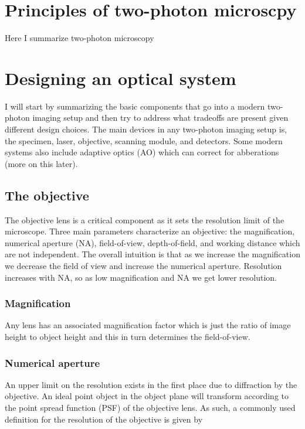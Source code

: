 

\section{Principles of two-photon microscpy}

Here I summarize two-photon microscopy

\section{Designing an optical system}

I will start by summarizing the basic components that go into a modern two-photon imaging setup and then try to 
address what tradeoffs are present given different design choices. The main devices in any two-photon imaging setup
is, the specimen, laser, objective, scanning module, and detectors. Some modern systems also include adaptive optics (AO) 
which can correct for abberations (more on this later).

\subsection{The objective}

The objective lens is a critical component as it sets the resolution limit of the microscope. Three main parameters
characterize an objective: the magnification, numerical aperture (NA), field-of-view, depth-of-field, and working distance 
which are not independent. The overall intuition is that as we increase the magnification we decrease the field of view
and increase the numerical aperture. Resolution increases with NA, so as low magnification and NA we get lower resolution.

\subsubsection{Magnification}
 
Any lens has an associated magnification factor which is just the ratio of image height to object height and this
in turn determines the field-of-view. 

\subsubsection{Numerical aperture}

An upper limit on the resolution exists in the first place due to diffraction by the objective. 
An ideal point object in the object plane will transform according to the point spread function 
(PSF) of the objective lens. As such, a commonly used definition for the resolution of the objective
is given by 

